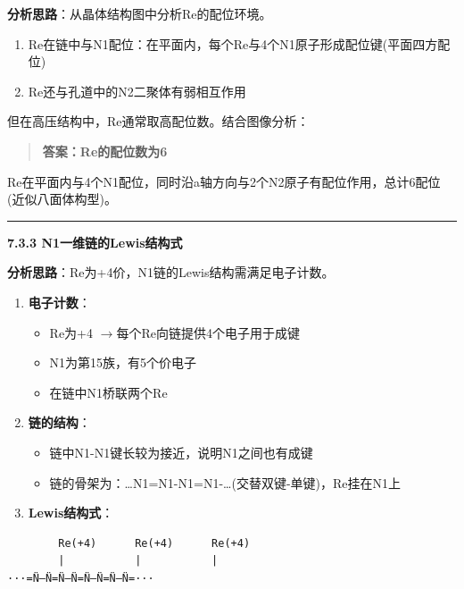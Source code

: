 \documentclass[a4paper,11pt]{ctexart}
\providecommand{\tightlist}{\setlength{\itemsep}{0pt}\setlength{\parskip}{0pt}}
\newcommand{\箭}{\ensuremath{\rightarrow}}
\newcommand{\左箭}{\ensuremath{\leftarrow}}
\newcommand{\上箭}{\ensuremath{\uparrow}}
\newcommand{\下箭}{\ensuremath{\downarrow}}
\newcommand{\衡}{\ensuremath{\rightleftharpoons}}
\newcommand{\双箭}{\ensuremath{\leftrightarrow}}
\newcommand{\约等于}{\ensuremath{\approx}}
\newcommand{\小于等于}{\ensuremath{\leq}}
\newcommand{\大于等于}{\ensuremath{\geq}}
\newcommand{\不等于}{\ensuremath{\neq}}
\newcommand{\西格马}{\ensuremath{\sigma}}
\newcommand{\派}{\ensuremath{\pi}}
\begin{document}
\textbf{分析思路}：从晶体结构图中分析Re的配位环境。

\begin{enumerate}
\def\labelenumi{\arabic{enumi}.}
\tightlist
\item
  Re在链中与N1配位：在平面内，每个Re与4个N1原子形成配位键(平面四方配位)
\item
  Re还与孔道中的N2二聚体有弱相互作用
\end{enumerate}

但在高压结构中，Re通常取高配位数。结合图像分析：

\begin{quote}
\textbf{答案：Re的配位数为6}
\end{quote}

Re在平面内与4个N1配位，同时沿a轴方向与2个N2原子有配位作用，总计6配位(近似八面体构型)。

\begin{center}\rule{0.5\linewidth}{0.5pt}\end{center}

\textbf{7.3.3 N1一维链的Lewis结构式}

\textbf{分析思路}：Re为+4价，N1链的Lewis结构需满足电子计数。

\begin{enumerate}
\def\labelenumi{\arabic{enumi}.}
\tightlist
\item
  \textbf{电子计数}：

  \begin{itemize}
  \tightlist
  \item
    Re为+4 \箭 每个Re向链提供4个电子用于成键
  \item
    N1为第15族，有5个价电子
  \item
    在链中N1桥联两个Re
  \end{itemize}
\item
  \textbf{链的结构}：

  \begin{itemize}
  \tightlist
  \item
    链中N1-N1键长较为接近，说明N1之间也有成键
  \item
    链的骨架为：\ldots N1=N1-N1=N1-\ldots(交替双键-单键)，Re挂在N1上
  \end{itemize}
\item
  \textbf{Lewis结构式}：
\end{enumerate}

\begin{verbatim}
        Re(+4)      Re(+4)      Re(+4)
        |           |           |
···=N̈—N̈=N̈—N̈=N̈—N̈=N̈—N̈=···
\end{verbatim}
\end{document}
